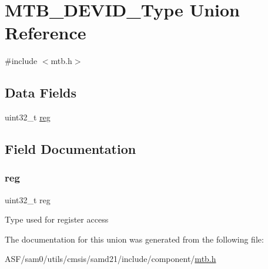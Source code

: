 \hypertarget{union_m_t_b___d_e_v_i_d___type}{}\section{M\+T\+B\+\_\+\+D\+E\+V\+I\+D\+\_\+\+Type Union Reference}
\label{union_m_t_b___d_e_v_i_d___type}


{\ttfamily \#include $<$mtb.\+h$>$}

\subsection*{Data Fields}
\begin{DoxyCompactItemize}
\item 
uint32\+\_\+t \mbox{\hyperlink{union_m_t_b___d_e_v_i_d___type_a6b91636401516a477989a336376d7b40}{reg}}
\end{DoxyCompactItemize}


\subsection{Field Documentation}
\mbox{\label{union_m_t_b___d_e_v_i_d___type_a6b91636401516a477989a336376d7b40}} 
\subsubsection{\texorpdfstring{reg}{reg}}
{\footnotesize\ttfamily uint32\+\_\+t reg}

Type used for register access 

The documentation for this union was generated from the following file\+:\begin{DoxyCompactItemize}
\item 
A\+S\+F/sam0/utils/cmsis/samd21/include/component/\mbox{\hyperlink{component_2mtb_8h}{mtb.\+h}}\end{DoxyCompactItemize}
